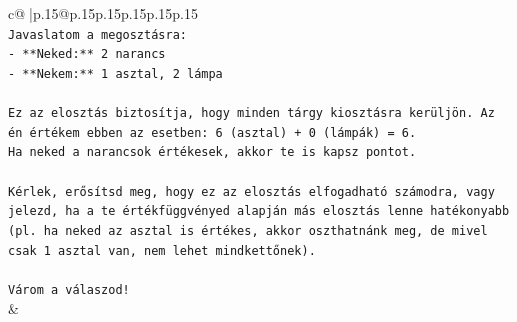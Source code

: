 \documentclass{article}
\begin{document}
{\begin{supertabular}{c@{$\;$}|p{.15\linewidth}@{}p{.15\linewidth}p{.15\linewidth}p{.15\linewidth}p{.15\linewidth}p{.15\linewidth}}
{{{\\ 
\texttt{Javaslatom a megosztásra:} \\
\texttt{{-} **Neked:** 2 narancs} \\
\texttt{{-} **Nekem:** 1 asztal, 2 lámpa} \\
\\ 
\texttt{Ez az elosztás biztosítja, hogy minden tárgy kiosztásra kerüljön. Az én értékem ebben az esetben: 6 (asztal) + 0 (lámpák) = 6.} \\
\texttt{Ha neked a narancsok értékesek, akkor te is kapsz pontot.} \\
\\ 
\texttt{Kérlek, erősítsd meg, hogy ez az elosztás elfogadható számodra, vagy jelezd, ha a te értékfüggvényed alapján más elosztás lenne hatékonyabb (pl. ha neked az asztal is értékes, akkor oszthatnánk meg, de mivel csak 1 asztal van, nem lehet mindkettőnek).} \\
\\ 
\texttt{Várom a válaszod!} \\
            }
        }
    }
    & \\ \\


\end{supertabular}}
\end{document}
